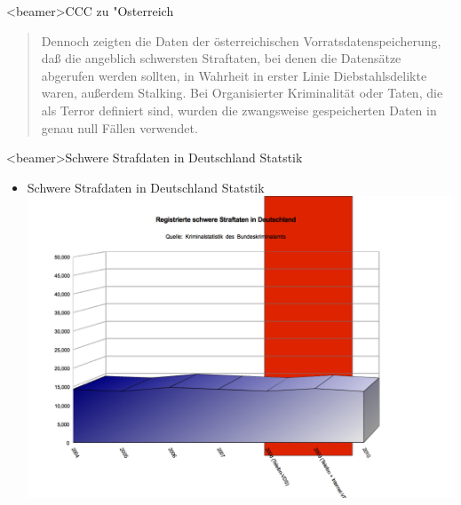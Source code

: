     \begin{frame}<beamer>{CCC zu "Osterreich}
      \begin{quote}
        Dennoch zeigten die Daten der österreichischen Vorratsdatenspeicherung, daß die angeblich schwersten Straftaten, bei denen die Datensätze abgerufen werden sollten, in Wahrheit in erster Linie Diebstahlsdelikte waren, außerdem Stalking. Bei Organisierter Kriminalität oder Taten, die als Terror definiert sind, wurden die zwangsweise gespeicherten Daten in genau null Fällen verwendet.

      \end{quote}
    \end{frame}

\begin{frame}<beamer>{Schwere Strafdaten in Deutschland Statstik}
\begin{itemize}
        \item Schwere Strafdaten in Deutschland Statstik
        \includegraphics[height=1\textheight]{sections/img/schwere_verbrechen_in_DE.png}
    \end{itemize}
    \end{frame}
    
